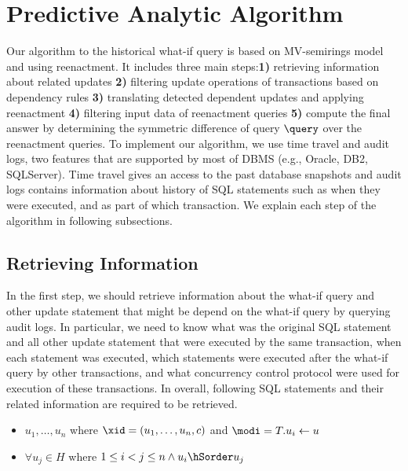 \section{Predictive Analytic Algorithm}
\label{sec:impl-appr}
Our algorithm to the historical what-if query is based on MV-semirings model and using reenactment. It includes three main steps:\textbf{1)} retrieving information about related updates \textbf{2)} filtering update operations of transactions based on dependency rules \textbf{3)} translating detected dependent updates and applying reenactment \textbf{4)} filtering input data of reenactment queries \textbf{5)} compute the final answer by determining the symmetric difference of query $\query$ over the reenactment queries. To implement our algorithm, we use time travel and audit logs, two features that are supported by most of DBMS (e.g., Oracle, DB2, SQLServer). Time travel gives an access to the past database snapshots and audit logs contains information about history of SQL statements such as when they were executed, and as part of which transaction. We explain each step of the algorithm in following subsections.
\subsection{Retrieving Information}
\label{def:retrieve-info}
In the first step, we should retrieve information about the what-if query and other update statement that might be depend on the what-if query by querying audit logs. In particular, we need to know what was the original SQL statement and all other update statement that were executed by the same transaction, when each statement was executed, which statements were executed after the what-if query by other transactions, and what concurrency control protocol were used for execution of these transactions.
In overall, following SQL statements and their related information are required to be retrieved.
\begin{itemize}
\item $u_1, \ldots, u_n$ where $\xid = (u_1, \ldots, u_n, c)$ and $\modi = T.u_i \gets u$
\item $\forall u_j \in H$ where $1 \leq i < j \leq n \wedge u_i \hSorder u_j$
\end{itemize}
